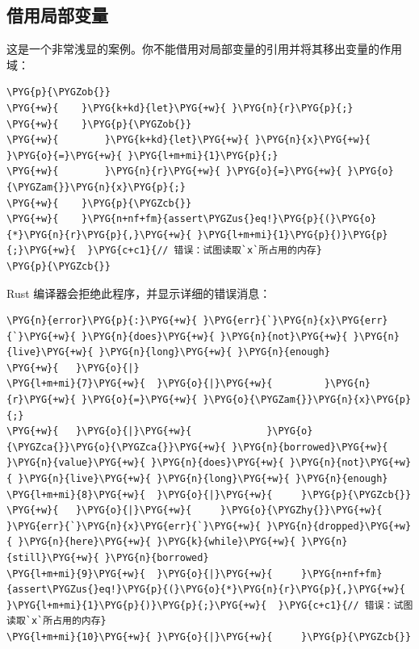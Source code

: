 \subsection{借用局部变量}

这是一个非常浅显的案例。你不能借用对局部变量的引用并将其移出变量的作用域：

\begin{Verbatim}[commandchars=\\\{\},breaklines=true,breakanywhere=true,fontsize=\codefont,xleftmargin=17bp]
\PYG{p}{\PYGZob{}}
\PYG{+w}{    }\PYG{k+kd}{let}\PYG{+w}{ }\PYG{n}{r}\PYG{p}{;}
\PYG{+w}{    }\PYG{p}{\PYGZob{}}
\PYG{+w}{        }\PYG{k+kd}{let}\PYG{+w}{ }\PYG{n}{x}\PYG{+w}{ }\PYG{o}{=}\PYG{+w}{ }\PYG{l+m+mi}{1}\PYG{p}{;}
\PYG{+w}{        }\PYG{n}{r}\PYG{+w}{ }\PYG{o}{=}\PYG{+w}{ }\PYG{o}{\PYGZam{}}\PYG{n}{x}\PYG{p}{;}
\PYG{+w}{    }\PYG{p}{\PYGZcb{}}
\PYG{+w}{    }\PYG{n+nf+fm}{assert\PYGZus{}eq!}\PYG{p}{(}\PYG{o}{*}\PYG{n}{r}\PYG{p}{,}\PYG{+w}{ }\PYG{l+m+mi}{1}\PYG{p}{)}\PYG{p}{;}\PYG{+w}{  }\PYG{c+c1}{// 错误：试图读取`x`所占用的内存}
\PYG{p}{\PYGZcb{}}
\end{Verbatim}

Rust 编译器会拒绝此程序，并显示详细的错误消息：

\begin{Verbatim}[commandchars=\\\{\},breaklines=true,breakanywhere=true,fontsize=\codefont,xleftmargin=17bp]
\PYG{n}{error}\PYG{p}{:}\PYG{+w}{ }\PYG{err}{`}\PYG{n}{x}\PYG{err}{`}\PYG{+w}{ }\PYG{n}{does}\PYG{+w}{ }\PYG{n}{not}\PYG{+w}{ }\PYG{n}{live}\PYG{+w}{ }\PYG{n}{long}\PYG{+w}{ }\PYG{n}{enough}
\PYG{+w}{   }\PYG{o}{|}
\PYG{l+m+mi}{7}\PYG{+w}{  }\PYG{o}{|}\PYG{+w}{         }\PYG{n}{r}\PYG{+w}{ }\PYG{o}{=}\PYG{+w}{ }\PYG{o}{\PYGZam{}}\PYG{n}{x}\PYG{p}{;}
\PYG{+w}{   }\PYG{o}{|}\PYG{+w}{             }\PYG{o}{\PYGZca{}}\PYG{o}{\PYGZca{}}\PYG{+w}{ }\PYG{n}{borrowed}\PYG{+w}{ }\PYG{n}{value}\PYG{+w}{ }\PYG{n}{does}\PYG{+w}{ }\PYG{n}{not}\PYG{+w}{ }\PYG{n}{live}\PYG{+w}{ }\PYG{n}{long}\PYG{+w}{ }\PYG{n}{enough}
\PYG{l+m+mi}{8}\PYG{+w}{  }\PYG{o}{|}\PYG{+w}{     }\PYG{p}{\PYGZcb{}}
\PYG{+w}{   }\PYG{o}{|}\PYG{+w}{     }\PYG{o}{\PYGZhy{}}\PYG{+w}{ }\PYG{err}{`}\PYG{n}{x}\PYG{err}{`}\PYG{+w}{ }\PYG{n}{dropped}\PYG{+w}{ }\PYG{n}{here}\PYG{+w}{ }\PYG{k}{while}\PYG{+w}{ }\PYG{n}{still}\PYG{+w}{ }\PYG{n}{borrowed}
\PYG{l+m+mi}{9}\PYG{+w}{  }\PYG{o}{|}\PYG{+w}{     }\PYG{n+nf+fm}{assert\PYGZus{}eq!}\PYG{p}{(}\PYG{o}{*}\PYG{n}{r}\PYG{p}{,}\PYG{+w}{ }\PYG{l+m+mi}{1}\PYG{p}{)}\PYG{p}{;}\PYG{+w}{  }\PYG{c+c1}{// 错误：试图读取`x`所占用的内存}
\PYG{l+m+mi}{10}\PYG{+w}{ }\PYG{o}{|}\PYG{+w}{     }\PYG{p}{\PYGZcb{}}
\end{Verbatim}


